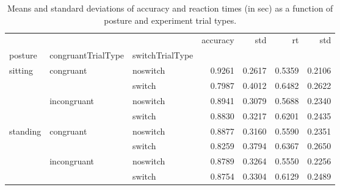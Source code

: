 \begin{table}
\centering
\caption{Means and standard deviations of accuracy and reaction times (in sec) as a function of posture and experiment trial types.}
\label{table-task-switching-replication-reaction-time}
\begin{tabular}{lllrrrr}
\toprule
         &             &        & accuracy &    std &     rt &    std \\
posture & congruantTrialType & switchTrialType &          &        &        &        \\
\midrule
sitting & congruant & noswitch &   0.9261 & 0.2617 & 0.5359 & 0.2106 \\
         &             & switch &   0.7987 & 0.4012 & 0.6482 & 0.2622 \\
         & incongruant & noswitch &   0.8941 & 0.3079 & 0.5688 & 0.2340 \\
         &             & switch &   0.8830 & 0.3217 & 0.6201 & 0.2435 \\
standing & congruant & noswitch &   0.8877 & 0.3160 & 0.5590 & 0.2351 \\
         &             & switch &   0.8259 & 0.3794 & 0.6367 & 0.2650 \\
         & incongruant & noswitch &   0.8789 & 0.3264 & 0.5550 & 0.2256 \\
         &             & switch &   0.8754 & 0.3304 & 0.6129 & 0.2489 \\
\bottomrule
\end{tabular}
\end{table}
